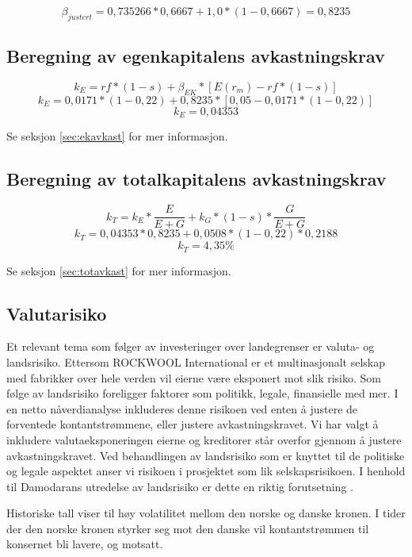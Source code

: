 \[\beta_{justert} = 0,735266 * 0,6667 + 1,0 * (1 - 0,6667) = 0,8235\]

\subsection{Beregning av egenkapitalens avkastningskrav}
\[k_E = rf * (1-s) + \beta_{EK} * [E(r_m)-rf * (1-s)] \]
\[k_E =0,0171*(1-0,22)+0,8235*[0,05-0,0171*(1-0,22)]\]
\[k_E =0,04353\]
\begin{center}Se seksjon \ref{sec:ekavkast} for mer informasjon.\end{center}

\subsection{Beregning av totalkapitalens avkastningskrav}
\[k_T = k_E * \frac{E}{E + G} + k_G * (1-s) * \frac{G}{E + G}\]
\[k_T = 0,04353*0,8235+0,0508*(1-0,22)*0,2188\]
\[k_T = 4,35\%\]
\begin{center}Se seksjon \ref{sec:totavkast} for mer informasjon.\end{center}

\subsection{Valutarisiko} 
Et relevant tema som følger av investeringer over landegrenser er valuta- og landsrisiko. Ettersom ROCKWOOL International er et multinasjonalt selskap med fabrikker over hele verden vil eierne være eksponert mot slik risiko. Som følge av landsrisiko foreligger faktorer som politikk, legale, finansielle med mer. I en netto nåverdianalyse inkluderes denne risikoen ved enten å justere de forventede kontantstrømmene, eller justere avkastningskravet. Vi har valgt å inkludere valutaeksponeringen eierne og kreditorer står overfor gjennom å justere avkastningskravet. Ved behandlingen av landsrisiko som er knyttet til de politiske og legale aspektet anser vi risikoen i prosjektet som lik selskapsrisikoen. I henhold til Damodarans utredelse av landsrisiko er dette en riktig forutsetning \cite{adamodar}.

\indent \newline
Historiske tall viser til høy volatilitet mellom den norske og danske kronen. I tider der den norske kronen styrker seg mot den danske vil kontantstrømmen til konsernet bli lavere, og motsatt.

